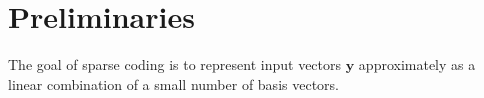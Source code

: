 \section{Preliminaries}
The goal of sparse coding is to represent input vectors $\mathbf{y}$ approximately as a linear combination of a small number of basis vectors.
